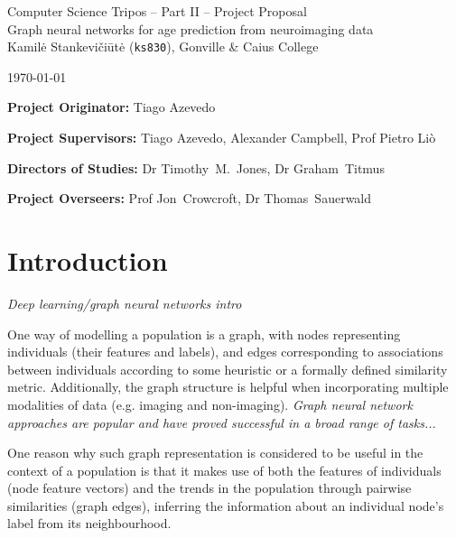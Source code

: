 \documentclass[12pt,a4paper,twoside]{article}
\begin{document}
\begin{center}
\Large
Computer Science Tripos -- Part II -- Project Proposal\\[4mm]
\LARGE
Graph neural networks for age prediction from neuroimaging data \\[4mm]

\large
Kamilė Stankevičiūtė (\texttt{ks830}), Gonville \& Caius College

\today %
\end{center}

\vspace{5mm}
\textbf{Project Originator:} Tiago Azevedo

\textbf{Project Supervisors:} Tiago Azevedo, Alexander Campbell, Prof Pietro Liò

\textbf{Directors of Studies:} Dr Timothy~M.~Jones, Dr Graham~Titmus

\textbf{Project Overseers:} Prof Jon~Crowcroft, Dr Thomas~Sauerwald


\section*{Introduction}

\textit{Deep learning/graph neural networks intro}


One way of modelling a population is a graph, with nodes representing individuals (their features and labels), and edges corresponding to associations between individuals according to some heuristic or a formally defined similarity metric. Additionally, the graph structure is helpful when incorporating multiple modalities of data (e.g. imaging and non-imaging). \textit{Graph neural network approaches are popular and have proved successful in a broad range of tasks...}

One reason why such graph representation is considered to be useful in the  context of a population is that it makes use of both the features of individuals (node feature vectors) and the trends in the population through pairwise similarities (graph edges), inferring the information about an individual node's label from its neighbourhood.
\end{document}
